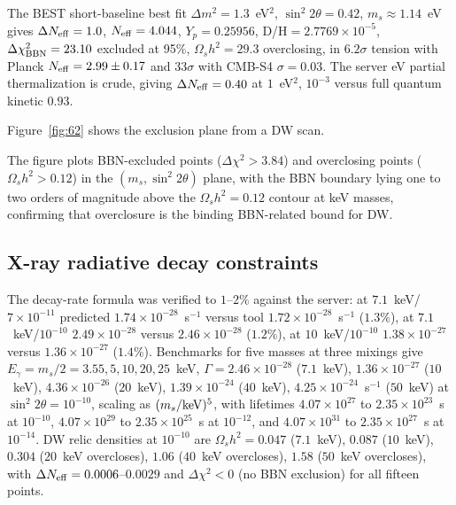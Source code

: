 \documentclass[11pt,a4paper]{article}
\begin{document}
The BEST short-baseline best fit $\Delta m^{2}=1.3$~eV$^{2}$, $\sin^{2}2\theta=0.42$, $m_{s}\approx1.14$~eV gives $\Delta N_{\rm eff}=1.0$, $N_{\rm eff}=4.044$, $Y_{p}=0.25956$, D/H$=2.7769\times10^{-5}$, $\Delta\chi^{2}_{\rm BBN}=23.10$ excluded at 95\%, $\Omega_{s}h^{2}=29.3$ overclosing, in $6.2\sigma$ tension with Planck $N_{\rm eff}=2.99\pm0.17$ and $33\sigma$ with CMB-S4 $\sigma=0.03$. The server eV partial thermalization is crude, giving $\Delta N_{\rm eff}=0.40$ at $1$~eV$^{2}$, $10^{-3}$ versus full quantum kinetic $0.93$.

Figure~\ref{fig:62} shows the exclusion plane from a DW scan.






The figure plots BBN-excluded points ($\Delta\chi^{2}>3.84$) and overclosing points ($\Omega_{s}h^{2}>0.12$) in the $(m_{s},\sin^{2}2\theta)$ plane, with the BBN boundary lying one to two orders of magnitude above the $\Omega_{s}h^{2}=0.12$ contour at keV masses, confirming that overclosure is the binding BBN-related bound for DW.

\subsection{X-ray radiative decay constraints}
The decay-rate formula was verified to $1$--$2\%$ against the server: at $7.1$~keV/$7\times10^{-11}$ predicted $1.74\times10^{-28}$~s$^{-1}$ versus tool $1.72\times10^{-28}$~s$^{-1}$ ($1.3\%$), at $7.1$~keV/$10^{-10}$ $2.49\times10^{-28}$ versus $2.46\times10^{-28}$ ($1.2\%$), at $10$~keV/$10^{-10}$ $1.38\times10^{-27}$ versus $1.36\times10^{-27}$ ($1.4\%$). Benchmarks for five masses at three mixings give $E_{\gamma}=m_{s}/2=3.55,5,10,20,25$~keV, $\Gamma=2.46\times10^{-28}$ ($7.1$~keV), $1.36\times10^{-27}$ ($10$~keV), $4.36\times10^{-26}$ ($20$~keV), $1.39\times10^{-24}$ ($40$~keV), $4.25\times10^{-24}$~s$^{-1}$ ($50$~keV) at $\sin^{2}2\theta=10^{-10}$, scaling as $(m_{s}/{\rm keV})^{5}$, with lifetimes $4.07\times10^{27}$ to $2.35\times10^{23}$~s at $10^{-10}$, $4.07\times10^{29}$ to $2.35\times10^{25}$~s at $10^{-12}$, and $4.07\times10^{31}$ to $2.35\times10^{27}$~s at $10^{-14}$. DW relic densities at $10^{-10}$ are $\Omega_{s}h^{2}=0.047$ ($7.1$~keV), $0.087$ ($10$~keV), $0.304$ ($20$~keV overcloses), $1.06$ ($40$~keV overcloses), $1.58$ ($50$~keV overcloses), with $\Delta N_{\rm eff}=0.0006$--$0.0029$ and $\Delta\chi^{2}<0$ (no BBN exclusion) for all fifteen points.
\end{document}
